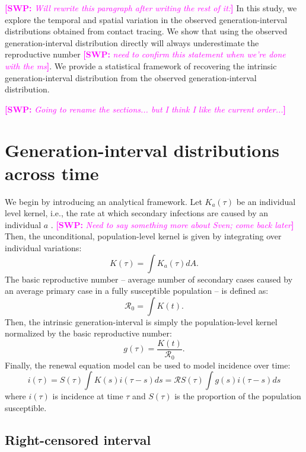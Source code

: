 \documentclass{article}
\newcommand{\RR}{\ensuremath{{\mathcal R}}}
\newcommand{\comment}[3]{\textcolor{#1}{\textbf{[#2: }\textsl{#3}\textbf{]}}}
\newcommand{\swp}[1]{\comment{magenta}{SWP}{#1}}
\begin{document}
\swp{Will rewrite this paragraph after writing the rest of it:}
In this study, we explore the temporal and spatial variation in the observed generation-interval distributions obtained from contact tracing.
We show that using the observed generation-interval distribution directly will always underestimate the reproductive number \swp{need to confirm this statement when we're done with the ms}. 
We provide a statistical framework of recovering the intrinsic generation-interval distribution from the observed generation-interval distribution.

\swp{Going to rename the sections... but I think I like the current order...}
\section{Generation-interval distributions across time}

We begin by introducing an analytical framework.
Let $K_a(\tau)$ be an individual level kernel, i.e., the rate at which secondary infections are caused by an individual $a$ \citep{svensson2015influence}. \swp{Need to say something more about Sven; come back later}
Then, the unconditional, population-level kernel is given by integrating over individual variations:
\begin{equation}
K(\tau) = \int K_a (\tau) dA.
\end{equation}
The basic reproductive number -- average number of secondary cases caused by an average primary case in a fully susceptible population -- is defined as: 
\begin{equation}
\RR_0 = \int K(t).
\end{equation}
Then, the intrinsic generation-interval is simply the population-level kernel normalized by the basic reproductive number:
\begin{equation}
g(\tau) = \frac{K(t)}{\RR_0}.
\end{equation}
Finally, the renewal equation model can be used to model incidence over time:
\begin{equation}
i(\tau) = S(\tau) \int K(s) i(\tau-s) ds = \RR S(\tau) \int g(s) i(\tau-s) ds
\end{equation}
where $i(\tau)$ is incidence at time $\tau$ and $S(\tau)$ is the proportion of the population susceptible.

\subsection*{Right-censored interval}
\end{document}
